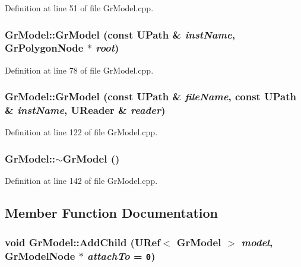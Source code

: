 Definition at line 51 of file GrModel.cpp.\hypertarget{class_gr_model_15d52f8774a7781ad079f8bf3604226f}{
\subsubsection[{GrModel}]{\setlength{\rightskip}{0pt plus 5cm}GrModel::GrModel (const {\bf UPath} \& {\em instName}, \/  {\bf GrPolygonNode} $\ast$ {\em root})}}
\label{class_gr_model_15d52f8774a7781ad079f8bf3604226f}




Definition at line 78 of file GrModel.cpp.\hypertarget{class_gr_model_2cf8487be82f62f575f549e0081435ae}{
\subsubsection[{GrModel}]{\setlength{\rightskip}{0pt plus 5cm}GrModel::GrModel (const {\bf UPath} \& {\em fileName}, \/  const {\bf UPath} \& {\em instName}, \/  {\bf UReader} \& {\em reader})}}
\label{class_gr_model_2cf8487be82f62f575f549e0081435ae}




Definition at line 122 of file GrModel.cpp.\hypertarget{class_gr_model_e48b47449f463e0b0a7b42943db1310c}{
\subsubsection[{$\sim$GrModel}]{\setlength{\rightskip}{0pt plus 5cm}GrModel::$\sim$GrModel ()}}
\label{class_gr_model_e48b47449f463e0b0a7b42943db1310c}




Definition at line 142 of file GrModel.cpp.

\subsection{Member Function Documentation}
\hypertarget{class_gr_model_c232d8ab1c8c5e6349acd53eebc9db61}{
\subsubsection[{AddChild}]{\setlength{\rightskip}{0pt plus 5cm}void GrModel::AddChild ({\bf URef}$<$ {\bf GrModel} $>$ {\em model}, \/  {\bf GrModelNode} $\ast$ {\em attachTo} = {\tt 0})}}
\label{class_gr_model_c232d8ab1c8c5e6349acd53eebc9db61}




